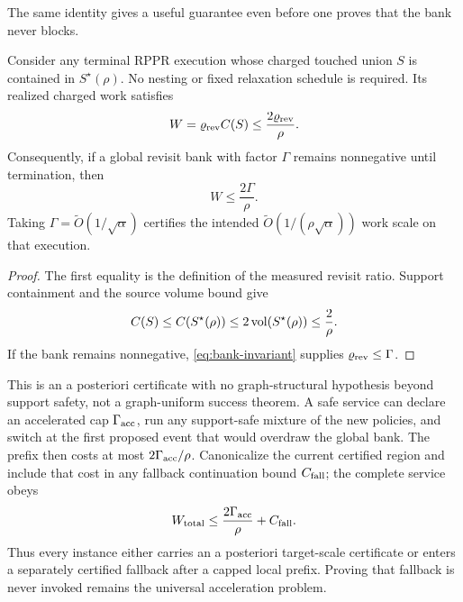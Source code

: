 The same identity gives a useful guarantee even before one proves that the
bank never blocks.

\begin{corollary}
\label{cor:rppr-fast-path}
Consider any terminal RPPR execution whose charged touched union $S$ is
contained in $S^\star(\rho)$.  No nesting or fixed relaxation schedule is
required.  Its realized charged work satisfies
\begin{equation}
 W=\varrho_{\rm rev}C(S)
 \leq \frac{2\varrho_{\rm rev}}{\rho}.
 \label{eq:rppr-fast-path}
\end{equation}
Consequently, if a global revisit bank with factor $\Gamma$ remains
nonnegative until termination, then
\begin{equation}
 W\leq\frac{2\Gamma}{\rho}.
 \label{eq:banked-rppr-fast-path}
\end{equation}
Taking $\Gamma=\widetilde O(1/\sqrt\alpha)$ certifies the intended
$\widetilde O(1/(\rho\sqrt\alpha))$ work scale on that execution.
\end{corollary}

\begin{proof}
The first equality is the definition of the measured revisit ratio.  Support
containment and the source volume bound give
\[
 C(S)\leq C(S^\star(\rho))
 \leq2\operatorname{vol}(S^\star(\rho))\leq\frac2\rho.
\]
If the bank remains nonnegative, \eqref{eq:bank-invariant} supplies
$\varrho_{\rm rev}\leq\Gamma$.
\end{proof}

This is an a posteriori certificate with no graph-structural hypothesis
beyond support safety, not a graph-uniform success theorem.  A safe service
can declare an
accelerated cap $\Gamma_{\rm acc}$, run any support-safe mixture of the new
policies, and switch at the first proposed event that would overdraw the
global bank.  The prefix then costs at most $2\Gamma_{\rm acc}/\rho$.
Canonicalize the current certified region and include that cost in any
fallback continuation bound $C_{\rm fall}$; the complete service obeys
\begin{equation}
 W_{\rm total}
 \leq \frac{2\Gamma_{\rm acc}}{\rho}+C_{\rm fall}.
 \label{eq:accelerated-or-fallback}
\end{equation}
Thus every instance either carries an a posteriori target-scale
certificate or enters a separately certified fallback after a capped local
prefix.  Proving that fallback is never invoked remains the universal
acceleration problem.

